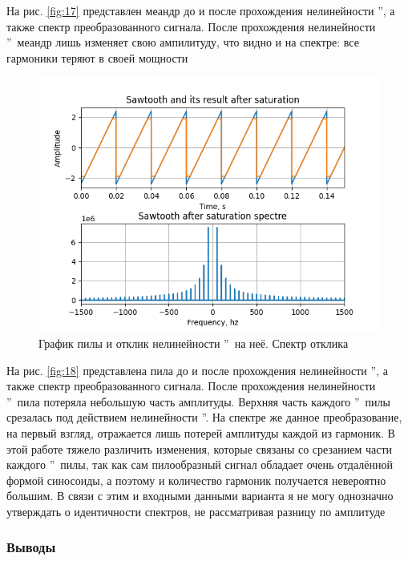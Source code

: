 На рис. \ref{fig:17} представлен меандр до и после прохождения
нелинейности \textquotedblright, а
также спектр преобразованного сигнала. После прохождения
нелинейности \textquotedblright\ 
меандр лишь изменяет свою ампилитуду, что видно и на спектре:
все гармоники теряют в своей мощности

\begin{figure}[H]
	\centering
	\includegraphics[width=0.75\linewidth]{body/images/sawtooth-after-saturation-and-its-spectre.png}
	\caption{График пилы и отклик нелинейности
	\textquotedblright\ на неё. Спектр отклика}
	\label{fig:21}
\end{figure}

На рис. \ref{fig:18} представлена пила до и после прохождения
нелинейности \textquotedblright, а
также спектр преобразованного сигнала. После прохождения
нелинейности \textquotedblright\ 
пила потеряла небольшую часть амплитуды. Верхняя часть
каждого \textquotedblleftзубчика\textquotedblright\ пилы срезалась
под действием нелинейности \textquotedblleftНасыщение\textquotedblright.
На спектре же данное преобразование, на первый взгляд, отражается
лишь потерей амплитуды каждой из гармоник. В этой работе тяжело
различить изменения, которые связаны со срезанием части каждого
\textquotedblleftзубчика\textquotedblright\ пилы, так как сам
пилообразный сигнал обладает очень отдалённой формой синосоиды, а
поэтому и количество гармоник получается невероятно большим. В
связи с этим и входными данными варианта я не могу однозначно
утверждать о идентичности спектров, не рассматривая разницу по
амплитуде

\subsubsection{Выводы}

